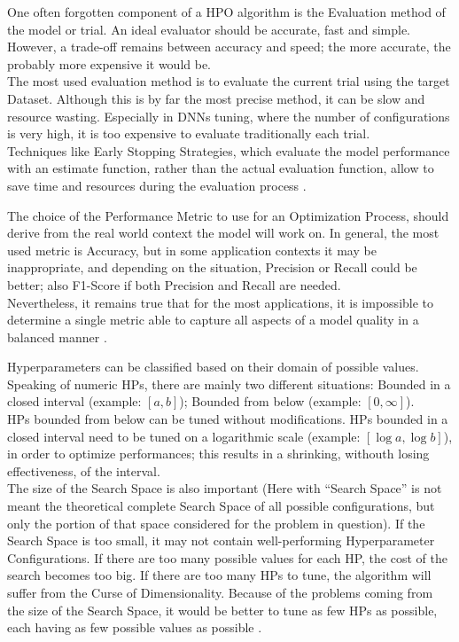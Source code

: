 % 
One often forgotten component of a HPO algorithm is the Evaluation method of the model or trial.
An ideal evaluator should be accurate, fast and simple. However, a trade-off remains between accuracy and speed; the more accurate, the probably more expensive it would be.
\\[0.3cm]The most used evaluation method is to evaluate the current trial using the target Dataset.
Although this is by far the most precise method, it can be slow and resource wasting. Especially in DNNs tuning, where the number of configurations is very high, it is too expensive to evaluate traditionally each trial.
\\[0.3cm]Techniques like Early Stopping Strategies, which evaluate the model performance with an estimate function, rather than the actual evaluation function, allow to save time and resources during the evaluation process \cite{Tesi-1.8}.

The choice of the Performance Metric to use for an Optimization Process, should derive from the real world context the model will work on.
In general, the most used metric is Accuracy, but in some application contexts it may be inappropriate, and depending on the situation, Precision or Recall could be better; also F1-Score if both Precision and Recall are needed.
\\[0.3cm]Nevertheless, it remains true that for the most applications, it is impossible to determine a single metric able to capture all aspects of a model quality in a balanced manner \cite{Tesi-1.8}.

Hyperparameters can be classified based on their domain of possible values.
Speaking of numeric HPs, there are mainly two different situations: Bounded in a closed interval (example: $[a,b]$); Bounded from below (example: $[0,\infty]$).
\\[0.3cm]HPs bounded from below can be tuned without modifications. HPs bounded in a closed interval need to be tuned on a logarithmic scale (example: $[\log a,\log b]$), in order to optimize performances; this results in a shrinking, withouth losing effectiveness, of the interval.
\\[0.3cm]The size of the Search Space is also important (Here with “Search Space” is not meant the theoretical complete Search Space of all possible configurations, but only the portion of that space considered for the problem in question). If the Search Space is too small, it may not contain well-performing Hyperparameter Configurations. If there are too many possible values for each HP, the cost of the search becomes too big. If there are too many HPs to tune, the algorithm will suffer from the Curse of Dimensionality.
Because of the problems coming from the size of the Search Space, it would be better to tune as few HPs as possible, each having as few possible values as possible \cite{Tesi-1.8}.

